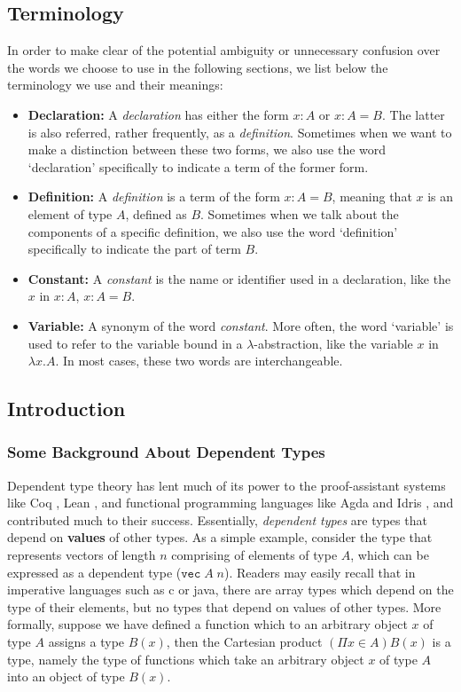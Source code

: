 \documentclass{article}
\theoremstyle{remark}
\begin{document}
\subsection{Terminology}
In order to make clear of the potential ambiguity or unnecessary confusion over the words we choose to use in the following sections, we list below the terminology we use and their meanings:
\begin{itemize}
  \item \textbf{Declaration:} A \emph{declaration} has either the form $x : A$ or $x : A = B$. The latter is also referred, rather frequently, as a \emph{definition}. Sometimes when we want to make a distinction between these two forms, we also use the word `declaration' specifically to indicate a term of the former form. 
  \item \textbf{Definition:} A \emph{definition} is a term of the form $x : A = B$, meaning that $x$ is an element of type $A$, defined as $B$. Sometimes when we talk about the components of a specific definition, we also use the word `definition' specifically to indicate the part of term $B$.  
  \item \textbf{Constant:} A \emph{constant} is the name or identifier used in a declaration, like the $x$ in $x : A$, $x : A = B$.
  \item \textbf{Variable:} A synonym of the word \emph{constant}. More often, the word `variable' is used to refer to the variable bound in a $\lambda$-abstraction, like the variable $x$ in $\lambda x . A$. In most cases, these two words are interchangeable. 
\end{itemize}

\subsection{Introduction}
\subsubsection{Some Background About Dependent Types}
Dependent type theory has lent much of its power to the proof-assistant systems like Coq \cite{huet1997coq}, Lean \cite{de2015lean}, and functional programming languages like Agda \cite{norell2008dependently} and Idris \cite{brady2013idris}, and contributed much to their success. Essentially, \emph{dependent types} are types that depend on \textbf{values} of other types. As a simple example, consider the type that represents vectors of length $n$ comprising of elements of type $A$, which can be expressed as a dependent type ($\texttt{vec}\; A\; n$). Readers may easily recall that in imperative languages such as c or java, there are array types which depend on the type of their elements, but no types that depend on values of other types. More formally, suppose we have defined a function which to an arbitrary object $x$ of type $A$ assigns a type $B(x)$, then the Cartesian product $(\Pi x \in A)B(x)$ is a type, namely the type of functions which take an arbitrary object $x$ of type $A$ into an object of type $B(x)$.
\end{document}
